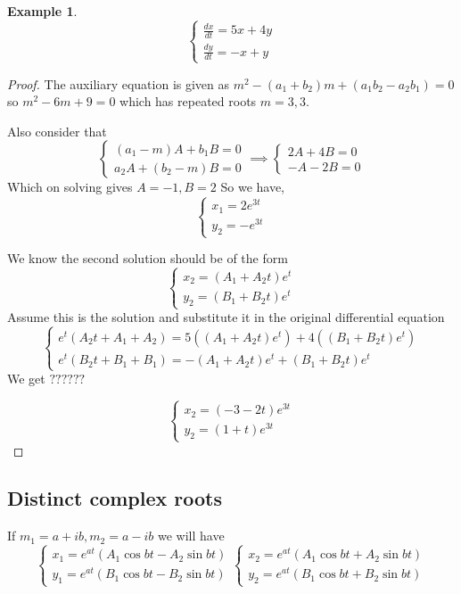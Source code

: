 \documentclass[oneside,11pt,pdftex,final]{book}%
\numberwithin{equation}{section}
\newtheorem{example}[theorem]{Example}
\numberwithin{section}{chapter}
\numberwithin{equation}{chapter}
\begin{document}
\begin{example}
	\[ \begin{cases}
		\frac{dx}{dt}=5x+4y\\
		\frac{dy}{dt}=-x+y
	\end{cases} \]
\end{example}
\begin{proof}
	The auxiliary equation is given as $ m^2-(a_1+b_2)m+(a_1b_2-a_2b_1)=0 $ so $ m^2-6m+9=0 $ which has repeated roots $ m=3,3 $.
	
		Also consider that
	\[ \begin{cases}
		(a_1-m)A+b_1B=0\\
		a_2A+(b_2-m)B=0
	\end{cases} \implies 
	\begin{cases}
		2A+4B=0\\
		-A-2B=0
	\end{cases}\]
	Which on solving gives $ A=-1,B=2 $
	So we have,
	\[ \begin{cases}
		x_1=2e^{3t}\\
		y_2=-e^{3t}
	\end{cases} \]

	We know the second solution should be of the form
	\[ \begin{cases}
		x_2=(A_1+A_2t)e^{t}\\
		y_2=(B_1+B_2t)e^{t}
	\end{cases} \]
	Assume this is the solution and substitute it in the original differential equation
	\[ \begin{cases}
		e^t (A_2 t + A_1 + A_2)=5((A_1+A_2t)e^{t})+4((B_1+B_2t)e^{t})\\
		e^t(B_2t+B_1+B_1)=-(A_1+A_2t)e^{t}+(B_1+B_2t)e^{t}
	\end{cases} \]
We get $ ?????? $

\[ \begin{cases}
	x_2=(-3-2t)e^{3t}\\
	y_2=(1+t)e^{3t}
\end{cases} \]
\end{proof}

\subsection{Distinct complex roots}
If $ m_1=a+ib,m_2=a-ib $ we will have \[ \begin{cases}
	x_1=e^{at}(A_1\cos bt -A_2 \sin bt)\\
	y_1=e^{at}(B_1\cos bt -B_2 \sin bt)
\end{cases} \begin{cases}
x_2=e^{at}(A_1\cos bt +A_2 \sin bt)\\
y_2=e^{at}(B_1\cos bt +B_2 \sin bt)
\end{cases} \]
\end{document}
